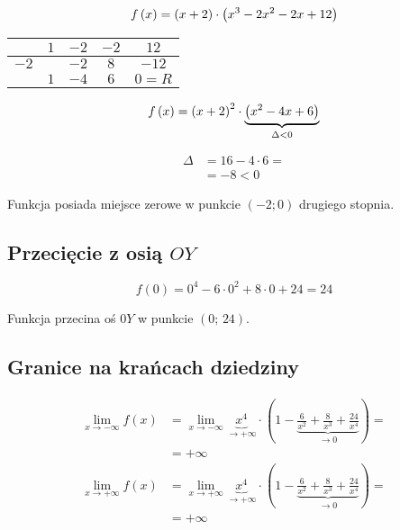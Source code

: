 \documentclass[a4paper,12pt]{article}
\newcommand{\fodx}{
		\ensuremath f \left( x \right)
	}
\begin{document}
\[\fodx =  \left(x + 2 \right) \cdot \left( x^3 - 2x^2 - 2x + 12 \right) \]

\begin{center}
	\begin{tabular}{l|c|c|c|c}
                           & $1$ & $-2$ & $-2$ & $12$    \\ \hline

		$-2$	&  & $-2$& $8$  & $-12$   \\ \hline

                           & $1$ & $-4$ & $6$  & $0 = R$ \\ 

\end{tabular}
\end{center}
\begin{minipage}[c]{0.7\textwidth}
	\[\fodx =  \left(x + 2 \right)^2 \cdot \underbrace{\left( x^2 - 4x + 6 \right)}_{\Delta < 0} \]
\end{minipage}
\hspace{0.15cm} \vline \hspace{0.15cm}
\begin{minipage}[c]{0.2\textwidth}
	\begin{align*}
		\Delta &= 16 - 4 \cdot 6 = \\
		&= -8 < 0
	\end{align*}
\end{minipage}
\vspace{0.5cm}

Funkcja posiada miejsce zerowe w punkcie $\left(-2; 0 \right)$ drugiego stopnia. 

\subsection{Przecięcie z osią $OY$}

\[f \left( 0 \right) = 0^4  - 6\cdot 0^2 + 8\cdot 0 + 24 = 24 \]

Funkcja przecina oś $0Y$ w punkcie $ \left( 0; \, 24 \right)$.

\subsection{Granice na krańcach dziedziny}

\begin{align*}
	\lim\limits_{x \to - \infty} f \left( x \right) &=\lim\limits_{x \to - \infty} \underbrace{x^4}_{\to + \infty} \cdot \left( 1 - \underbrace{\frac{6}{x^2} + \frac{8}{x^3} + \frac{24}{x^4}}_{\to 0} \right) =\\
	&= + \infty \\
	\lim\limits_{x \to + \infty} f\left( x \right) &= \lim\limits_{x \to +\infty} \underbrace{x^4}_{\to + \infty} \cdot \left( 1 - \underbrace{\frac{6}{x^2} + \frac{8}{x^3} + \frac{24}{x^4}}_{\to 0} \right) = \\
	&= + \infty
\end{align*}
\end{document}
